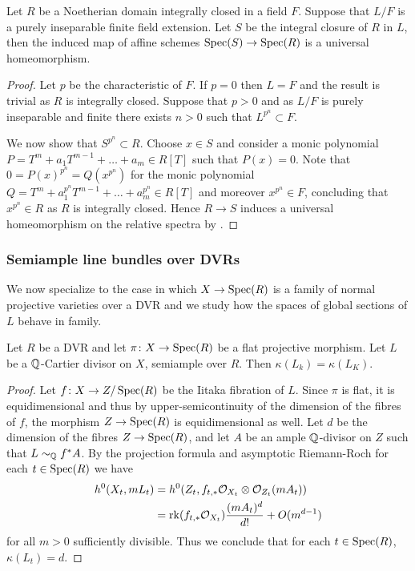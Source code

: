 	\begin{lemma}\label{affine-uni-hom}
		
		Let $R$ be a Noetherian domain integrally closed in a field $F$. Suppose that $L/F$ is a purely inseparable finite field extension. Let $S$ be the integral closure of $R$ in $L$, then the induced map of affine schemes $\operatorname{Spec}(S) \to \operatorname{Spec}(R)$ is a universal homeomorphism.
	\end{lemma}
	
	\begin{proof}
		Let $p$ be the characteristic of $F$. If $p=0$ then $L=F$ and the result is trivial as $R$ is integrally closed.
		Suppose that $p>0$ and as $L/F$ is purely inseparable and finite there exists $n>0$ such that $L^{p^n }\subset F$.
		
		We now show that $S^{p^n} \subset R$. 
		Choose $x \in S$ and consider a monic polynomial $P=T^m+a_1T^{m-1}+ \dots +a_m \in R[T]$ such that $P(x)=0$.
		Note that $0=P(x)^{p^n}=Q(x^{p^n})$ for the monic polynomial $Q=T^m+a_1^{p^n}T^{m-1}+ \dots +a_m^{p^n} \in R[T]$ and moreover $x^{p^n} \in F$, concluding that $x^{p^n} \in R$ as $R$ is integrally closed. 
		Hence $R \to S$ induces a universal homeomorphism on the relative spectra by \cite[Tag 0BRA]{stacks-project}. 
	\end{proof}
	
	\subsubsection{Semiample line bundles over DVRs}
	We now specialize to the case in which $X\to\operatorname{Spec} (R)$ is a family of normal projective varieties over a DVR and we study how the spaces of global sections of $L$ behave in family.
	
	\begin{lemma}\label{lemma_DIOK}
		Let $R$ be a DVR and let $\pi \colon X\to \operatorname{Spec} (R)$ be a flat projective morphism. 
		Let $L$ be a $\mathbb{Q}$-Cartier divisor on $X$, semiample over $R$. 
		Then $\kappa(L_k)=\kappa(L_K)$.
	\end{lemma}
	
	\begin{proof}
		Let $f \colon X\to Z/\operatorname{Spec} (R)$ be the Iitaka fibration of $L$. Since $\pi$ is flat, it is equidimensional and thus by upper-semicontinuity of the dimension of the fibres of $f$, the morphism $Z\to\operatorname{Spec} (R)$ is equidimensional as well. Let $d$ be the dimension of the fibres $Z \to \operatorname{Spec}(R)$, and let $A$ be an ample $\mathbb{Q}$-divisor on $Z$ such that $L\sim_{\mathbb{Q}}f^\ast A$. By the projection formula and asymptotic Riemann-Roch \cite[Theorem VI.2.15]{k-rat-curves} for each $t \in \operatorname{Spec}(R)$ we have
		\begin{equation*}
			\begin{split}
				h^0(X_t,mL_t)&=h^0(Z_t,f_{t,*} \mathcal{O}_{X_t}\otimes\mathcal{O}_{Z_t}(mA_t))\\
				&=\mathrm{rk} (f_{t,*} \mathcal{O}_{X_t})\frac{(mA_t)^d}{d!}+O(m^{d-1})
			\end{split}
		\end{equation*}
		for all $m> 0$ sufficiently divisible. Thus we conclude that for each $t \in \operatorname{Spec}(R)$, $\kappa(L_t)=d$.
	\end{proof}
	
